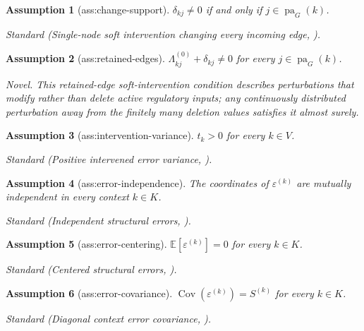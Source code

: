 \documentclass{article}
\newtheorem{assumption}{Assumption}
\begin{document}
\begin{assumption}[ass:change-support]\label{ass:change-support}
\(\delta_{kj}\ne0\) if and only if \(j\in\operatorname{pa}_{G}(k)\).
\par\smallskip\noindent\emph{Standard} (Single-node soft intervention changing every incoming edge, \cite{LeyesCarrenoMeroniSeigal2025}).
\end{assumption}

\begin{assumption}[ass:retained-edges]\label{ass:retained-edges}
\(\Lambda^{(0)}_{kj}+\delta_{kj}\ne0\) for every \(j\in\operatorname{pa}_{G}(k)\).
\par\smallskip\noindent\emph{Novel.} This retained-edge soft-intervention condition describes perturbations that modify rather than delete active regulatory inputs; any continuously distributed perturbation away from the finitely many deletion values satisfies it almost surely.
\end{assumption}

\begin{assumption}[ass:intervention-variance]\label{ass:intervention-variance}
\(t_k>0\) for every \(k\in V\).
\par\smallskip\noindent\emph{Standard} (Positive intervened error variance, \cite{SquiresSeigalBhateUhler2023}).
\end{assumption}

\begin{assumption}[ass:error-independence]\label{ass:error-independence}
The coordinates of \(\varepsilon^{(k)}\) are mutually independent in every context \(k\in K\).
\par\smallskip\noindent\emph{Standard} (Independent structural errors, \cite{LeyesCarrenoMeroniSeigal2025}).
\end{assumption}

\begin{assumption}[ass:error-centering]\label{ass:error-centering}
\(\mathbb E[\varepsilon^{(k)}]=0\) for every \(k\in K\).
\par\smallskip\noindent\emph{Standard} (Centered structural errors, \cite{LeyesCarrenoMeroniSeigal2025}).
\end{assumption}

\begin{assumption}[ass:error-covariance]\label{ass:error-covariance}
\(\operatorname{Cov}(\varepsilon^{(k)})=S^{(k)}\) for every \(k\in K\).
\par\smallskip\noindent\emph{Standard} (Diagonal context error covariance, \cite{SquiresSeigalBhateUhler2023}).
\end{assumption}
\end{document}
